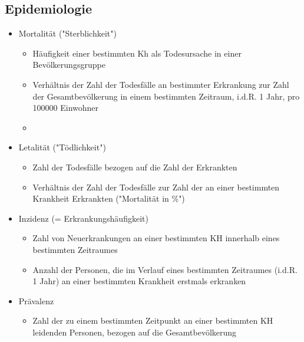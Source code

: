 \subsection{Epidemiologie}
	\begin{itemize}
		\item Mortalität ("Sterblichkeit")
			\begin{itemize}
				\item Häufigkeit einer bestimmten Kh als Todesursache in einer Bevölkerungsgruppe
				\item Verhältnis der Zahl der Todesfälle an bestimmter Erkrankung zur Zahl der Gesamtbevölkerung in einem bestimmten Zeitraum, i.d.R. 1 Jahr, pro 100000 Einwohner
				\item 
			\end{itemize}
		\item Letalität ("Tödlichkeit")
			\begin{itemize}
				\item Zahl der Todesfälle bezogen auf die Zahl der Erkrankten
				\item Verhältnis der Zahl der Todesfälle zur Zahl der an einer bestimmten Krankheit Erkrankten ("Mortalität in \%")
			\end{itemize}
	\end{itemize}

	\begin{itemize}
		\item Inzidenz (= Erkrankungshäufigkeit)
			\begin{itemize}
				\item Zahl von Neuerkrankungen an einer bestimmten KH innerhalb eines bestimmten Zeitraumes
				\item Anzahl der Personen, die im Verlauf eines bestimmten Zeitraumes (i.d.R. 1 Jahr) an einer bestimmten Krankheit erstmals erkranken
			\end{itemize}
		\item Prävalenz
			\begin{itemize}
				\item Zahl der zu einem bestimmten Zeitpunkt an einer bestimmten KH leidenden Personen, bezogen auf die Gesamtbevölkerung
			\end{itemize}
	\end{itemize}

